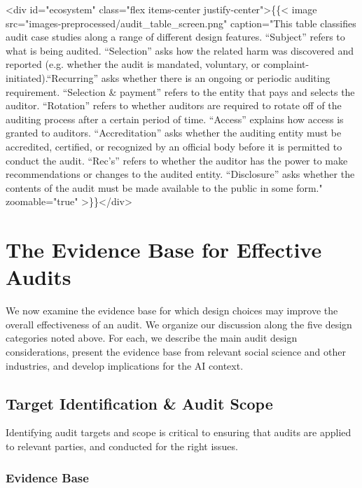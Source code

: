 \documentclass[sigconf]{acmart}
\begin{document}
<div id="ecosystem" class="flex items-center justify-center">\{\{< image src="images-preprocessed/audit_table_screen.png" caption="This table classifies audit case studies along a range of different design features. “Subject” refers to what is being audited. “Selection” asks how the related harm was discovered and reported (e.g. whether the audit is mandated, voluntary, or complaint-initiated).“Recurring” asks whether there is an ongoing or periodic auditing requirement. “Selection \& payment” refers to the entity that pays and selects the auditor. “Rotation” refers to whether auditors are required to rotate off of the auditing process after a certain period of time. “Access” explains how access is granted to auditors. “Accreditation” asks whether the auditing entity must be accredited, certified, or recognized by an official body before it is permitted to conduct the audit. “Rec’s” refers to whether the auditor has the power to make recommendations or changes to the audited entity. “Disclosure” asks whether the contents of the audit must be made available to the public in some form." zoomable="true" >\}\}</div>






\section{The Evidence Base for Effective Audits}
We now examine the evidence base for which design choices may improve the overall effectiveness of an audit. We organize our discussion along the five design categories noted above. 
For each, we describe the main audit design considerations, present the evidence base from relevant social science and other industries, and develop implications for the AI context. 

\subsection{Target Identification \& Audit Scope}
Identifying audit targets and scope is critical to ensuring that audits are applied to relevant parties, and conducted for the right issues. 

\subsubsection{Evidence Base} 
\end{document}
